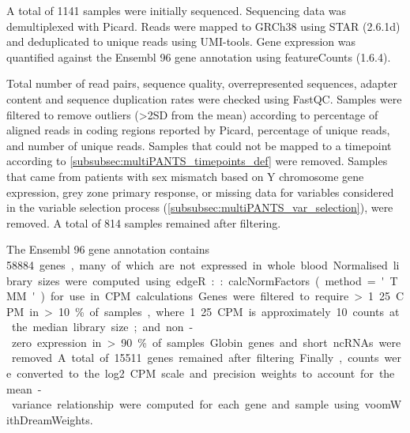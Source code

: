 \begin{outline}
A total of 1141 samples were initially sequenced.
Sequencing data was demultiplexed with Picard.
%
Reads were mapped to GRCh38 using STAR (2.6.1d) and deduplicated to unique reads using UMI-tools.
Gene expression was quantified against the Ensembl 96 gene annotation using featureCounts (1.6.4).

Total number of read pairs, sequence quality, overrepresented sequences, adapter content and sequence duplication rates were checked using FastQC.
Samples were filtered to remove outliers (>2SD from the mean) according to percentage of aligned reads in coding regions reported by Picard, percentage of unique reads, and number of unique reads.
Samples that could not be mapped to a timepoint according to \autoref{subsubsec:multiPANTS_timepoints_def} were removed.
Samples that came from patients with 
sex mismatch based on Y chromosome gene expression,
grey zone primary response, 
or missing data for variables considered in the variable selection process (\autoref{subsubsec:multiPANTS_var_selection}),
were removed.
A total of 814 samples remained after filtering.

The Ensembl 96 gene annotation contains \SI{58884} genes, many of which are not expressed in whole blood.
Normalised library sizes were computed using edgeR::calcNormFactors(method='TMM') for use in CPM calculations.
Genes were filtered to require 
>1.25 CPM in >10\% of samples, where 1.25 CPM is approximately 10 counts at the median library size;
and non-zero expression in >90\% of samples.
Globin genes and short ncRNAs were removed.
A total of 15511 genes remained after filtering.
Finally, counts were converted to the log2 CPM scale and precision weights to account for the mean-variance relationship were computed for each gene and sample using voomWithDreamWeights.


\end{outline}
